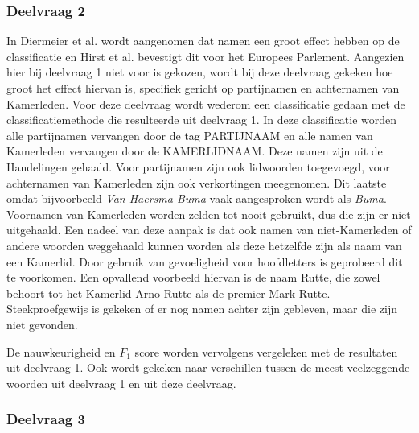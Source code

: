 \subsubsection{Deelvraag 2}
In Diermeier et al. \cite{diermeier_godbout_yu_kaufmann_2012} wordt aangenomen dat namen een groot effect hebben op de classificatie en Hirst et al. \cite{Hirst_textto} bevestigt dit voor het Europees Parlement. Aangezien hier bij deelvraag 1 niet voor is gekozen, wordt bij deze deelvraag gekeken hoe groot het effect hiervan is, specifiek gericht op partijnamen en achternamen van Kamerleden. Voor deze deelvraag wordt wederom een classificatie gedaan met de classificatiemethode die resulteerde uit deelvraag 1. In deze classificatie worden alle partijnamen vervangen door de tag PARTIJNAAM en alle namen van Kamerleden vervangen door de KAMERLIDNAAM. Deze namen zijn uit de Handelingen gehaald. Voor partijnamen zijn ook lidwoorden toegevoegd, voor achternamen van Kamerleden zijn ook verkortingen meegenomen. Dit laatste omdat bijvoorbeeld \textit{Van Haersma Buma} vaak aangesproken wordt als \textit{Buma}. Voornamen van Kamerleden worden zelden tot nooit gebruikt, dus die zijn er niet uitgehaald. Een nadeel van deze aanpak is dat ook namen van niet-Kamerleden of andere woorden weggehaald kunnen worden als deze hetzelfde zijn als naam van een Kamerlid. Door gebruik van gevoeligheid voor hoofdletters is geprobeerd dit te voorkomen. Een opvallend voorbeeld hiervan is de naam Rutte, die zowel behoort tot het Kamerlid Arno Rutte als de premier Mark Rutte. Steekproefgewijs is gekeken of er nog namen achter zijn gebleven, maar die zijn niet gevonden. \par
De nauwkeurigheid en $F_1$ score worden vervolgens vergeleken met de resultaten uit deelvraag 1. Ook wordt gekeken naar verschillen tussen de meest veelzeggende woorden uit deelvraag 1 en uit deze deelvraag.

\subsubsection{Deelvraag 3}

